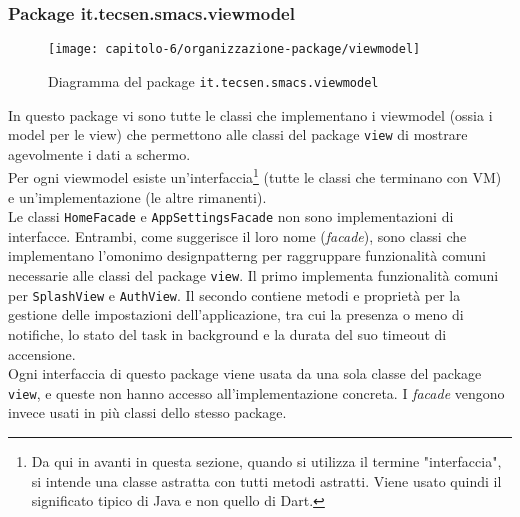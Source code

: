 \subsubsection{Package it.tecsen.smacs.viewmodel}
\label{subsubsec:it-tecsen-smacs-viewmodel}

\begin{figure}[!h]
  \centering 
  \texttt{[image: capitolo-6/organizzazione-package/viewmodel]} 
  \caption{Diagramma del package \texttt{it.tecsen.smacs.viewmodel}}
\end{figure}
In questo package vi sono tutte le classi che implementano i viewmodel (ossia i model per le view) che permettono alle classi del package \texttt{view} di mostrare agevolmente i dati a schermo.\\
Per ogni viewmodel esiste un'interfaccia\footnote{Da qui in avanti in questa sezione, quando si utilizza il termine "interfaccia", si intende una classe astratta con tutti metodi astratti. Viene usato quindi il significato tipico di Java e non quello di Dart.} (tutte le classi che terminano con VM) e un'implementazione (le altre rimanenti).\\
Le classi \texttt{HomeFacade} e \texttt{AppSettingsFacade} non sono implementazioni di interfacce. Entrambi, come suggerisce il loro nome (\emph{facade}), sono classi che implementano l'omonimo \gls{designpatterng} per raggruppare funzionalità comuni necessarie alle classi del package \texttt{view}.
Il primo implementa funzionalità comuni per \texttt{SplashView} e \texttt{AuthView}. Il secondo contiene metodi e proprietà per la gestione delle impostazioni dell'applicazione, tra cui la presenza o meno di notifiche, lo stato del task in background e la durata del suo timeout di accensione.\\
Ogni interfaccia di questo package viene usata da una sola classe del package \texttt{view}, e queste non hanno accesso all'implementazione concreta. I \emph{facade} vengono invece usati in più classi dello stesso package.
